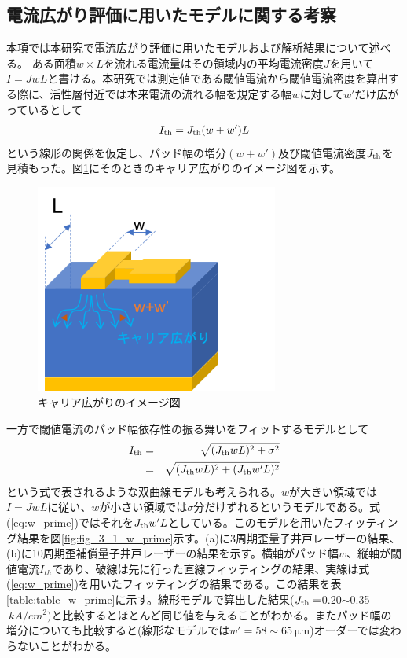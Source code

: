 \subsection{電流広がり評価に用いたモデルに関する考察}%
本項では本研究で電流広がり評価に用いたモデルおよび解析結果について述べる。
ある面積$w\times L$を流れる電流量はその領域内の平均電流密度$J$を用いて$I=JwL$と書ける。本研究では測定値である閾値電流から閾値電流密度を算出する際に、活性層付近では本来電流の流れる幅を規定する幅$w$に対して$w'$だけ広がっているとして
\begin{eqnarray}
I_{\rm{th}}=J_{\rm{th}}(w+w')L
\end{eqnarray}
という線形の関係を仮定し、パッド幅の増分$(w+w')$及び閾値電流密度$J_{\rm{th}}$を見積もった。図\ref{fig:fig_3_1_w_prime_figure}にそのときのキャリア広がりのイメージ図を示す。
\begin{figure}[h]
	\centering
	\includegraphics[width=8cm]{figure/fig_3_1_w_prime_figure.png}
	\caption{キャリア広がりのイメージ図}
	\label{fig:fig_3_1_w_prime_figure}
\end{figure}



一方で閾値電流のパッド幅依存性の振る舞いをフィットするモデルとして
\begin{eqnarray}
I_{\rm{th}}&=&\sqrt{(J_{\rm{th}}wL)^2+\sigma^2}\\
&=&\sqrt{(J_{\rm{th}}wL)^2+(J_{\rm{th}}w'L)^2}
\label{eq:w_prime}
\end{eqnarray}
という式で表されるような双曲線モデルも考えられる。$w$が大きい領域では$I=JwL$に従い、$w$が小さい領域では$\sigma$分だけずれるというモデルである。式(\ref{eq:w_prime})ではそれを$J_{\rm{th}}w'L$としている。このモデルを用いたフィッティング結果を図\ref{fig:fig_3_1_w_prime}示す。(a)に3周期歪量子井戸レーザーの結果、(b)に10周期歪補償量子井戸レーザーの結果を示す。横軸がパッド幅$w$、縦軸が閾値電流$I_{th}$であり、破線は先に行った直線フィッティングの結果、実線は式(\ref{eq:w_prime})を用いたフィッティングの結果である。この結果を表\ref{table:table_w_prime}に示す。線形モデルで算出した結果($J_{\rm{th}}=$0.20$\sim$0.35 $\ \si{kA/cm^2})$と比較するとほとんど同じ値を与えることがわかる。またパッド幅の増分についても比較すると(線形なモデルでは$w'=58\sim65\ \si{\micro\metre}$)オーダーでは変わらないことがわかる。

